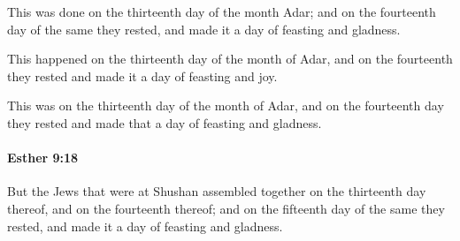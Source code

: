			\begin{versebox}
					\item[BHS] 
					\item[LXX] 
					\item[ASV] This was done on the thirteenth day of the month Adar; and on the fourteenth day of the same they rested, and made it a day of feasting and gladness.
					\item[NIV] This happened on the thirteenth day of the month of Adar, and on the fourteenth they rested and made it a day of feasting and joy.
					\item[NRSV] This was on the thirteenth day of the month of Adar, and on the fourteenth day they rested and made that a day of feasting and gladness.
			\end{versebox}

		\paragraph{Esther 9:18} %
			\label{ESTHER-9-18}

			But the Jews that were at Shushan assembled together on the thirteenth day thereof, and on the fourteenth thereof; and on the fifteenth day of the same they rested, and made it a day of feasting and gladness.

